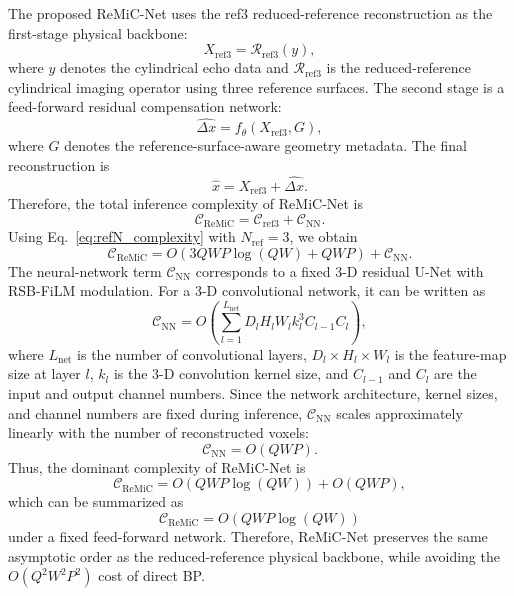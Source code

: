 \documentclass[journal]{IEEEtran}
\begin{document}
The proposed ReMiC-Net uses the ref3 reduced-reference reconstruction as the first-stage physical backbone:
\begin{equation}
    X_{\mathrm{ref3}} = \mathcal{R}_{\mathrm{ref3}}(y),
\end{equation}
where $y$ denotes the cylindrical echo data and $\mathcal{R}_{\mathrm{ref3}}$ is the reduced-reference cylindrical imaging operator using three reference surfaces. The second stage is a feed-forward residual compensation network:
\begin{equation}
    \widehat{\Delta x}
    = f_{\theta}\left(X_{\mathrm{ref3}},G\right),
\end{equation}
where $G$ denotes the reference-surface-aware geometry metadata. The final reconstruction is
\begin{equation}
    \hat{x} = X_{\mathrm{ref3}} + \widehat{\Delta x}.
\end{equation}
Therefore, the total inference complexity of ReMiC-Net is
\begin{equation}
    \mathcal{C}_{\mathrm{ReMiC}}
    = \mathcal{C}_{\mathrm{ref3}} + \mathcal{C}_{\mathrm{NN}}.
\end{equation}
Using Eq.~\eqref{eq:refN_complexity} with $N_{\mathrm{ref}}=3$, we obtain
\begin{equation}
    \mathcal{C}_{\mathrm{ReMiC}}
    = O\left(3QWP\log(QW)+QWP\right)
    + \mathcal{C}_{\mathrm{NN}}.
\end{equation}
The neural-network term $\mathcal{C}_{\mathrm{NN}}$ corresponds to a fixed 3-D residual U-Net with RSB-FiLM modulation. For a 3-D convolutional network, it can be written as
\begin{equation}
    \mathcal{C}_{\mathrm{NN}}
    = O\left(
    \sum_{l=1}^{L_{\mathrm{net}}}
    D_lH_lW_l k_l^3 C_{l-1}C_l
    \right),
\end{equation}
where $L_{\mathrm{net}}$ is the number of convolutional layers, $D_l\times H_l\times W_l$ is the feature-map size at layer $l$, $k_l$ is the 3-D convolution kernel size, and $C_{l-1}$ and $C_l$ are the input and output channel numbers. Since the network architecture, kernel sizes, and channel numbers are fixed during inference, $\mathcal{C}_{\mathrm{NN}}$ scales approximately linearly with the number of reconstructed voxels:
\begin{equation}
    \mathcal{C}_{\mathrm{NN}} = O(QWP).
\end{equation}
Thus, the dominant complexity of ReMiC-Net is
\begin{equation}
    \mathcal{C}_{\mathrm{ReMiC}}
    = O\left(QWP\log(QW)\right)+O(QWP),
\end{equation}
which can be summarized as
\begin{equation}
    \boxed{
    \mathcal{C}_{\mathrm{ReMiC}}
    = O\left(QWP\log(QW)\right)
    }
\end{equation}
under a fixed feed-forward network. Therefore, ReMiC-Net preserves the same asymptotic order as the reduced-reference physical backbone, while avoiding the $O(Q^2W^2P^2)$ cost of direct BP.
\end{document}
